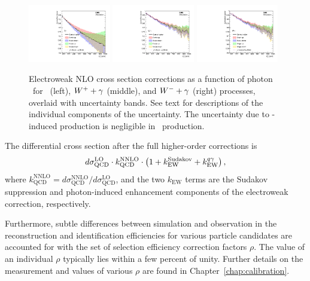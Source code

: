 \begin{figure}[htbp]
  \centering
  \includegraphics[width=0.32\textwidth]{Analysis/Figures/ewkcorr/zg.pdf}
  \includegraphics[width=0.32\textwidth]{Analysis/Figures/ewkcorr/wgplus.pdf}
  \includegraphics[width=0.32\textwidth]{Analysis/Figures/ewkcorr/wgminus.pdf}
  \caption{
    Electroweak NLO cross section corrections as a function of photon \pt\ for \zinvg\ (left), ${W}^{+}+\gamma$ (middle), and ${W}^{-}+\gamma$ (right) processes, overlaid with uncertainty bands. 
    See text for descriptions of the individual components of the uncertainty.
    The uncertainty due to \Pgg-induced production is negligible in \zinvg\ production.
  }
  \label{fig:ewk_correction}
\end{figure}

The differential cross section after the full higher-order corrections is
\begin{equation}
  d\sigma^{\text{LO}}_{\text{QCD}} \cdot k^{\text{NNLO}}_{\text{QCD}} \cdot \left(1 + k_{\text{EW}}^{\text{Sudakov}} + k_{\text{EW}}^{{q}\gamma} \right),
\end{equation}
where $k^{\text{NNLO}}_{\text{QCD}} = d\sigma^{\text{NNLO}}_{\text{QCD}} / d\sigma^{\text{LO}}_{\text{QCD}}$, and the two $k_{\text{EW}}$ terms are the Sudakov suppression and photon-induced enhancement components of the electroweak correction, respectively.

Furthermore, subtle differences between simulation and observation in the reconstruction and identification efficiencies for various particle candidates are accounted for with the set of selection efficiency correction factors $\rho$. 
The value of an individual $\rho$ typically lies within a few percent of unity. 
Further details on the measurement and values of various $\rho$ are found in Chapter~\ref{chap:calibration}. %

